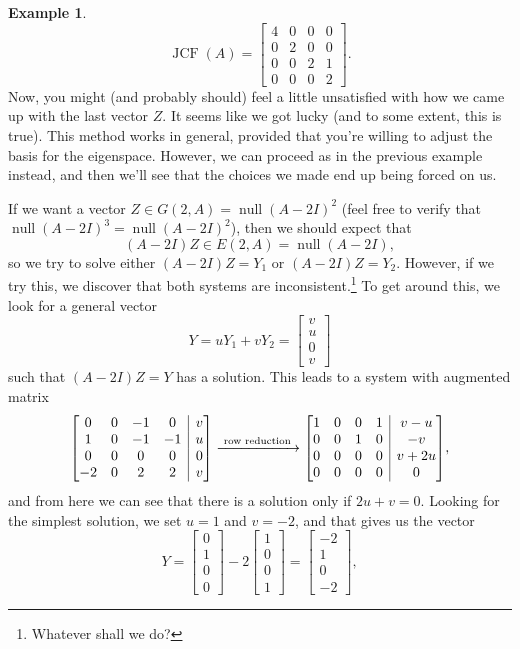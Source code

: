 \documentclass[12pt,letterpaper]{article}
\makeatletter
\theoremstyle{definition}
\newtheorem{example}{Example}
\newenvironment{amatrix}[1]{%
  \left[\begin{array}{@{}*{#1}{c}|c@{}}
}{%
  \end{array}\right]
}
\DeclareMathOperator{\nul}{null}
\DeclareMathOperator{\jcf}{JCF}
\makeatother
\begin{document}
\begin{example}
\[
 \jcf(A) = \begin{bmatrix}4&0&0&0\\0&2&0&0\\0&0&2&1\\0&0&0&2\end{bmatrix}.
\]
Now, you might (and probably should) feel a little unsatisfied with how we came up with the last vector $Z$. It seems like we got lucky (and to some extent, this is true). This method works in general, provided that you're willing to adjust the basis for the eigenspace. However, we can proceed as in the previous example instead, and then we'll see that the choices we made end up being forced on us.

If we want a vector $Z\in G(2,A)=\nul (A-2I)^2$ (feel free to verify that $\nul(A-2I)^3=\nul(A-2I)^2$), then we should expect that
\[
 (A-2I)Z\in E(2,A) = \nul (A-2I),
\]
so we try to solve either $(A-2I)Z=Y_1$ or $(A-2I)Z=Y_2$. However, if we try this, we discover that both systems are inconsistent.\footnote{Whatever shall we do?} To get around this, we look for a general vector 
\[
Y=uY_1+vY_2=\begin{bmatrix}v\\u\\0\\v\end{bmatrix}
\]
such that $(A-2I)Z=Y$ has a solution. This leads to a system with augmented matrix
\[
 \begin{amatrix}{4}
  0&0&-1&0&v\\1&0&-1&-1&u\\0&0&0&0&0\\-2&0&2&2&v
 \end{amatrix}\xrightarrow[]{\text{ row reduction }}
\begin{amatrix}{4}
 1&0&0&1&v-u\\0&0&1&0&-v\\0&0&0&0&v+2u\\0&0&0&0&0
\end{amatrix},
\]
and from here we can see that there is a solution only if $2u+v=0$. Looking for the simplest solution, we set $u=1$ and $v=-2$, and that gives us the vector
\[
 Y = \begin{bmatrix}0\\1\\0\\0\end{bmatrix}-2\begin{bmatrix}1\\0\\0\\1\end{bmatrix} = \begin{bmatrix}-2\\1\\0\\-2\end{bmatrix},
\]
\end{example}
\end{document}
